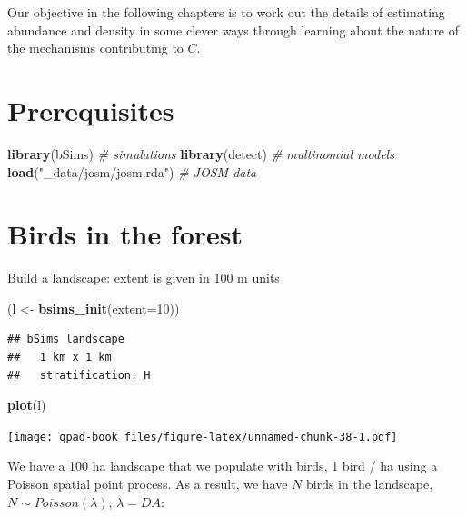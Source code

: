 \documentclass[12pt,]{book}
\newenvironment{Shaded}{\begin{snugshade}}{\end{snugshade}}
\newcommand{\CommentTok}[1]{\textcolor[rgb]{0.56,0.35,0.01}{\textit{#1}}}
\newcommand{\DataTypeTok}[1]{\textcolor[rgb]{0.13,0.29,0.53}{#1}}
\newcommand{\DecValTok}[1]{\textcolor[rgb]{0.00,0.00,0.81}{#1}}
\newcommand{\KeywordTok}[1]{\textcolor[rgb]{0.13,0.29,0.53}{\textbf{#1}}}
\newcommand{\NormalTok}[1]{#1}
\newcommand{\StringTok}[1]{\textcolor[rgb]{0.31,0.60,0.02}{#1}}
\begin{document}
Our objective in the following chapters is to work out the details of
estimating abundance and density in some clever ways through
learning about the nature of the mechanisms contributing to \(C\).

\hypertarget{prerequisites-2}{%
\section{Prerequisites}\label{prerequisites-2}}

\begin{Shaded}
\begin{Highlighting}[]
\KeywordTok{library}\NormalTok{(bSims)                }\CommentTok{# simulations}
\KeywordTok{library}\NormalTok{(detect)               }\CommentTok{# multinomial models}
\KeywordTok{load}\NormalTok{(}\StringTok{"_data/josm/josm.rda"}\NormalTok{) }\CommentTok{# JOSM data}
\end{Highlighting}
\end{Shaded}

\hypertarget{birds-in-the-forest}{%
\section{Birds in the forest}\label{birds-in-the-forest}}

Build a landscape: extent is given in 100 m units

\begin{Shaded}
\begin{Highlighting}[]
\NormalTok{(l <-}\StringTok{ }\KeywordTok{bsims_init}\NormalTok{(}\DataTypeTok{extent=}\DecValTok{10}\NormalTok{))}
\end{Highlighting}
\end{Shaded}

\begin{verbatim}
## bSims landscape
##   1 km x 1 km
##   stratification: H
\end{verbatim}

\begin{Shaded}
\begin{Highlighting}[]
\KeywordTok{plot}\NormalTok{(l)}
\end{Highlighting}
\end{Shaded}

\texttt{[image: qpad-book\_files/figure-latex/unnamed-chunk-38-1.pdf]}

We have a 100 ha landscape that we populate with birds,
1 bird / ha using a Poisson spatial point process.
As a result, we have \(N\) birds in the landscape,
\(N \sim Poisson(\lambda)\), \(\lambda = DA\):
\end{document}
